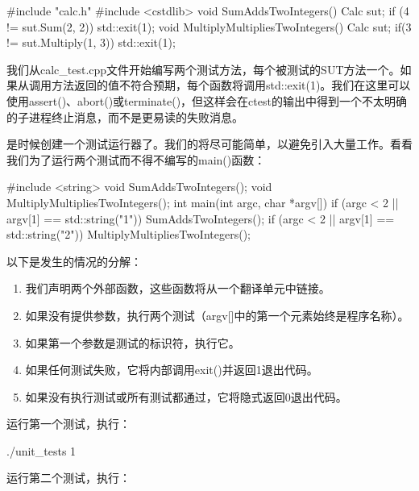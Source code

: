 
\begin{cpp}
#include "calc.h"
#include <cstdlib>
void SumAddsTwoIntegers() {
    Calc sut;
    if (4 != sut.Sum(2, 2))
        std::exit(1);
}
void MultiplyMultipliesTwoIntegers() {
    Calc sut;
    if(3 != sut.Multiply(1, 3))
    std::exit(1);
}
\end{cpp}

我们从calc\_test.cpp文件开始编写两个测试方法，每个被测试的SUT方法一个。如果从调用方法返回的值不符合预期，每个函数将调用std::exit(1)。我们在这里可以使用assert()、abort()或terminate()，但这样会在ctest的输出中得到一个不太明确的子进程终止消息，而不是更易读的失败消息。

是时候创建一个测试运行器了。我们的将尽可能简单，以避免引入大量工作。看看我们为了运行两个测试而不得不编写的main()函数：


\begin{cpp}
#include <string>
void SumAddsTwoIntegers();
void MultiplyMultipliesTwoIntegers();
int main(int argc, char *argv[]) {
    if (argc < 2 || argv[1] == std::string("1"))
        SumAddsTwoIntegers();
    if (argc < 2 || argv[1] == std::string("2"))
        MultiplyMultipliesTwoIntegers();
}
\end{cpp}

以下是发生的情况的分解：

\begin{enumerate}
\item
我们声明两个外部函数，这些函数将从一个翻译单元中链接。

\item
如果没有提供参数，执行两个测试（argv[]中的第一个元素始终是程序名称）。

\item
如果第一个参数是测试的标识符，执行它。

\item
如果任何测试失败，它将内部调用exit()并返回1退出代码。

\item
如果没有执行测试或所有测试都通过，它将隐式返回0退出代码。
\end{enumerate}

运行第一个测试，执行：

\begin{shell}
./unit_tests 1
\end{shell}

运行第二个测试，执行：

